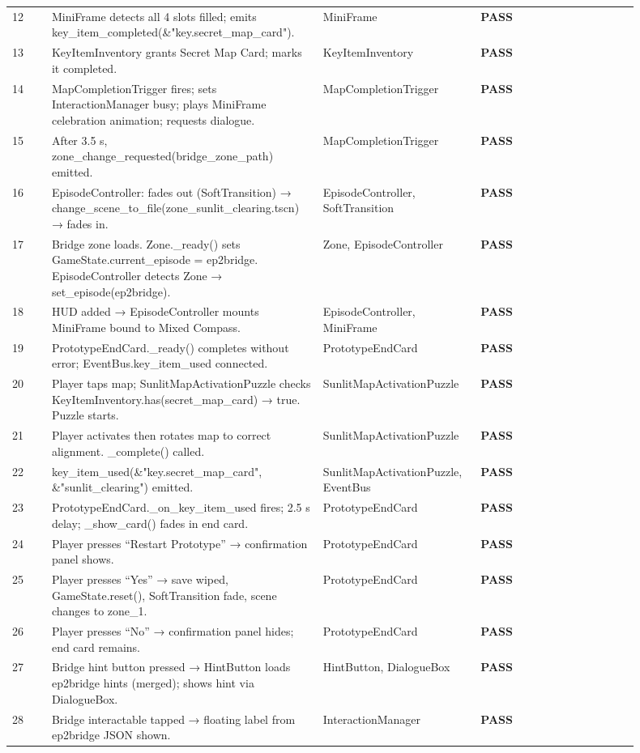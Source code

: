 \documentclass[12pt, a4paper]{article}
\newcommand{\statuspass}{\textcolor{passgre}{\textbf{PASS}}}
\begin{document}
\begin{longtable}{p{0.06\linewidth} p{0.38\linewidth} p{0.22\linewidth} p{0.24\linewidth}}
12 & MiniFrame detects all 4 slots filled; emits key\_item\_completed(\&"key.secret\_map\_card"). & MiniFrame & \statuspass \\
13 & KeyItemInventory grants Secret Map Card; marks it completed. & KeyItemInventory & \statuspass \\
14 & MapCompletionTrigger fires; sets InteractionManager busy; plays MiniFrame celebration animation; requests dialogue. & MapCompletionTrigger & \statuspass \\
15 & After 3.5 s, zone\_change\_requested(bridge\_zone\_path) emitted. & MapCompletionTrigger & \statuspass \\
16 & EpisodeController: fades out (SoftTransition) → change\_scene\_to\_file(zone\_sunlit\_clearing.tscn) → fades in. & EpisodeController, SoftTransition & \statuspass \\
17 & Bridge zone loads. Zone.\_ready() sets GameState.current\_episode = ep2bridge. EpisodeController detects Zone → set\_episode(ep2bridge). & Zone, EpisodeController & \statuspass \\
18 & HUD added → EpisodeController mounts MiniFrame bound to Mixed Compass. & EpisodeController, MiniFrame & \statuspass \\
19 & PrototypeEndCard.\_ready() completes without error; EventBus.key\_item\_used connected. & PrototypeEndCard & \statuspass \\
20 & Player taps map; SunlitMapActivationPuzzle checks KeyItemInventory.has(secret\_map\_card) → true. Puzzle starts. & SunlitMapActivationPuzzle & \statuspass \\
21 & Player activates then rotates map to correct alignment. \_complete() called. & SunlitMapActivationPuzzle & \statuspass \\
22 & key\_item\_used(\&"key.secret\_map\_card", \&"sunlit\_clearing") emitted. & SunlitMapActivationPuzzle, EventBus & \statuspass \\
23 & PrototypeEndCard.\_on\_key\_item\_used fires; 2.5 s delay; \_show\_card() fades in end card. & PrototypeEndCard & \statuspass \\
24 & Player presses ``Restart Prototype'' → confirmation panel shows. & PrototypeEndCard & \statuspass \\
25 & Player presses ``Yes'' → save wiped, GameState.reset(), SoftTransition fade, scene changes to zone\_1. & PrototypeEndCard & \statuspass \\
26 & Player presses ``No'' → confirmation panel hides; end card remains. & PrototypeEndCard & \statuspass \\
27 & Bridge hint button pressed → HintButton loads ep2bridge hints (merged); shows hint via DialogueBox. & HintButton, DialogueBox & \statuspass \\
28 & Bridge interactable tapped → floating label from ep2bridge JSON shown. & InteractionManager & \statuspass \\

\end{longtable}
\end{document}

